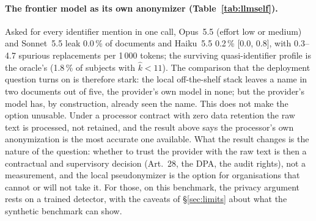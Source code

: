 \documentclass[11pt,a4paper]{article}
\begin{document}
\paragraph{The frontier model as its own anonymizer (Table~\ref{tab:llmself}).} Asked for every identifier mention in one call, Opus~5.5 (effort low or medium) and Sonnet~5.5 leak 0.0\,\% of documents and Haiku~5.5 0.2\,\% [0.0, 0.8], with 0.3--4.7 spurious replacements per 1\,000 tokens; the surviving quasi-identifier profile is the oracle's (1.8\,\% of subjects with $\hat k<11$). The comparison that the deployment question turns on is therefore stark: the local off-the-shelf stack leaves a name in two documents out of five, the provider's own model in none; but the provider's model has, by construction, already seen the name. This does not make the option unusable. Under a processor contract with zero data retention the raw text is processed, not retained, and the result above says the processor's own anonymization is the most accurate one available. What the result changes is the nature of the question: whether to trust the provider with the raw text is then a contractual and supervisory decision (Art.~28, the DPA, the audit rights), not a measurement, and the local pseudonymizer is the option for organisations that cannot or will not take it. For those, on this benchmark, the privacy argument rests on a trained detector, with the caveats of \S\ref{sec:limits} about what the synthetic benchmark can show.
\end{document}
